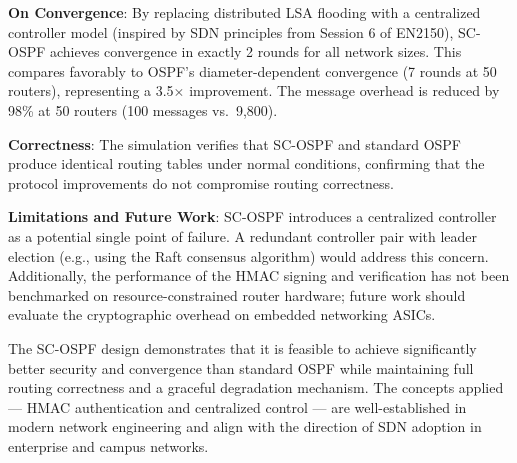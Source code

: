 \documentclass[12pt,a4paper]{article}
\begin{document}
\textbf{On Convergence}: By replacing distributed LSA flooding with a centralized
controller model (inspired by SDN principles from Session 6 of EN2150), SC-OSPF
achieves convergence in exactly 2 rounds for all network sizes. This compares
favorably to OSPF's diameter-dependent convergence (7 rounds at 50 routers),
representing a 3.5$\times$ improvement. The message overhead is reduced by 98\%
at 50 routers (100 messages vs.\ 9,800).

\textbf{Correctness}: The simulation verifies that SC-OSPF and standard OSPF
produce identical routing tables under normal conditions, confirming that the
protocol improvements do not compromise routing correctness.

\textbf{Limitations and Future Work}: SC-OSPF introduces a centralized controller
as a potential single point of failure. A redundant controller pair with leader
election (e.g., using the Raft consensus algorithm) would address this concern.
Additionally, the performance of the HMAC signing and verification has not been
benchmarked on resource-constrained router hardware; future work should evaluate
the cryptographic overhead on embedded networking ASICs.

The SC-OSPF design demonstrates that it is feasible to achieve significantly
better security and convergence than standard OSPF while maintaining full
routing correctness and a graceful degradation mechanism. The concepts applied
--- HMAC authentication and centralized control --- are well-established in
modern network engineering and align with the direction of SDN adoption in
enterprise and campus networks.
\end{document}
